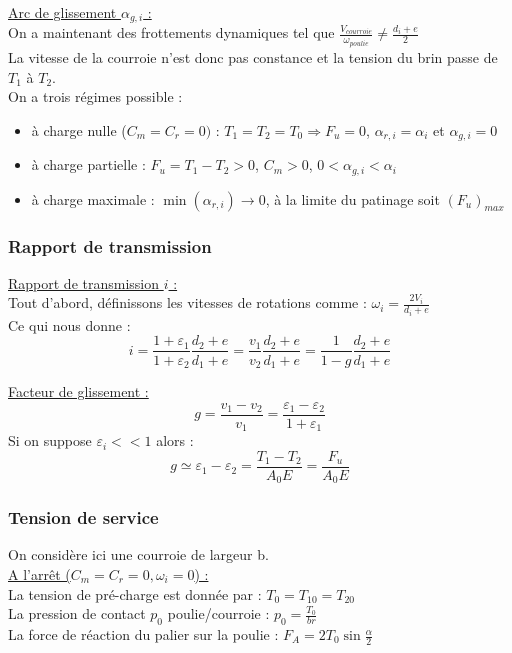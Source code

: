 \documentclass[../main.tex]{subfiles}
\begin{document}
\quad \underline{Arc de glissement $\alpha_{g,i}$ :}\\
On a maintenant des frottements dynamiques tel que $\frac{V_{courroie}}{\omega_{poulie}} \neq \frac{d_i + e}{2}$\\
La vitesse de la courroie n'est donc pas constance et la tension du brin passe de $T_1$ à $T_2$.\\

On a trois régimes possible : \begin{itemize}
    \item à charge nulle ($C_m = C_r = 0)$ : $T_1 = T_2 = T_0 \Rightarrow F_u = 0$, $\alpha_{r,i} = \alpha_i$ et $\alpha_{g,i} = 0$\\
    \item à charge partielle : $F_u = T_1-T_2>0$, $C_m>0$, $0 < \alpha_{g,i}<\alpha_i$\\
    \item à charge maximale : $\min(\alpha_{r,i}) \rightarrow 0$, à la limite du patinage soit $(F_u)_{max}$\\
\end{itemize}

\subsubsection{Rapport de transmission}
\quad \underline{Rapport de transmission $i$ :}\\
Tout d'abord, définissons les vitesses de rotations comme : $\omega_i = \frac{2 V_i}{d_i+e}$\\
Ce qui nous donne : \begin{equation}
    i = \frac{1+ \varepsilon_1}{1+\varepsilon_2} \frac{d_2+e}{d_1+e} = \frac{v_1}{v_2} \frac{d_2 +e}{d_1 + e} = \frac{1}{1-g} \frac{d_2+e}{d_1+e}
\end{equation}

\quad \underline{Facteur de glissement :}\\
\begin{equation}
    g = \frac{v_1-v_2}{v_1} = \frac{\varepsilon_1 - \varepsilon_2}{1+\varepsilon_1}
\end{equation}
Si on suppose $\varepsilon_i<<1$ alors : \begin{equation}
    g \simeq \varepsilon_1 - \varepsilon_2 = \frac{T_1-T_2}{A_0 E} = \frac{F_u}{A_0 E}
\end{equation}

\subsubsection{Tension de service}
On considère ici une courroie de largeur b.\\
\quad \underline{A l'arrêt ($C_m = C_r = 0, \omega_i =0$) :}\\
La tension de pré-charge est donnée par : $T_0 = T_{10} = T_{20}$\\
La pression de contact $p_0$ poulie/courroie : $p_0 = \frac{T_0}{br}$\\
La force de réaction du palier sur la poulie : $F_A = 2 T_0 \sin{\frac{\alpha}{2}}$\\
\end{document}
